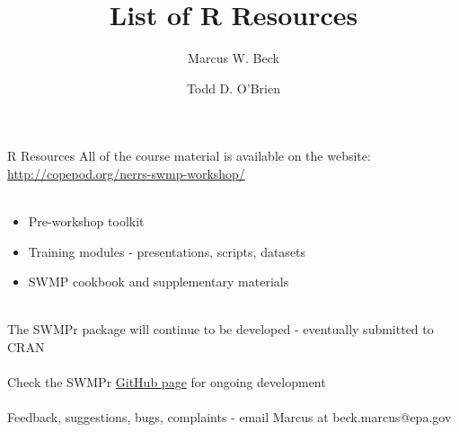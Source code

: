 \documentclass[xcolor=svgnames]{beamer}\usepackage[]{graphicx}\usepackage[]{color}
\begin{document}
\title[R Resources]{List of R Resources}

\author[M. Beck, T. O'Brien]{Marcus W. Beck \and Todd D. O'Brien}

\date{}







\begin{frame}[t]{R Resources}
All of the course material is available on the website: \href{http://copepod.org/nerrs-swmp-workshop/}{http://copepod.org/nerrs-swmp-workshop/}\\~\\

\begin{itemize}
\item Pre-workshop toolkit
\item Training modules - presentations, scripts, datasets
\item SWMP cookbook and supplementary materials \\~\\
\end{itemize}

The SWMPr package will continue to be developed - eventually submitted to CRAN \\
~\\
Check the SWMPr \href{https://github.com/fawda123/SWMPr}{GitHub page} for ongoing development \\~\\
Feedback, suggestions, bugs, complaints - email Marcus at beck.marcus@epa.gov
\end{frame}
\end{document}
